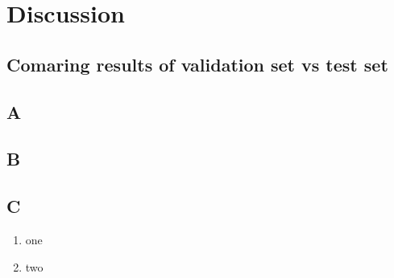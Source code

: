 \documentclass[12pt]{article}
\begin{document}
\newpage
\section{Discussion}
\subsection{Comaring results of validation set vs test set}
\subsection{A}
\subsection{B}
\subsection{C}

\begin{enumerate}
	\item one
	\item two
\end{enumerate}
\end{document}
